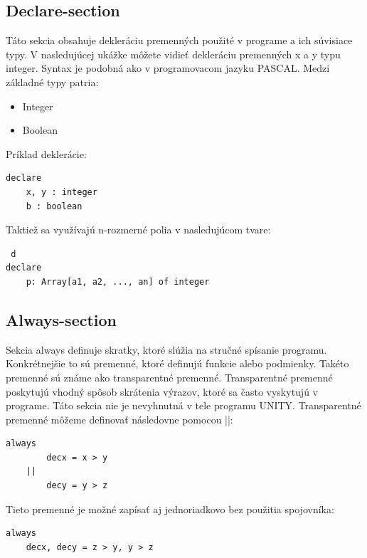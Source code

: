 \subsection{Declare-section}

Táto sekcia obsahuje dekleráciu premenných použité v programe a ich súvisiace typy. 
V nasledujúcej ukážke môžete vidieť dekleráciu premenných x a y typu integer. 
Syntax je podobná ako v programovacom jazyku PASCAL. Medzi základné typy patria:
\begin{itemize}
	\item Integer
	\item Boolean
\end{itemize}

\vspace{5mm}

Príklad deklerácie:
\begin{lstlisting}
declare 
	x, y : integer
	b : boolean
\end{lstlisting}

\vspace{5mm}

Taktiež sa využívajú n-rozmerné polia v nasledujúcom tvare:
\begin{lstlisting} d
declare 
	p: Array[a1, a2, ..., an] of integer
\end{lstlisting}

\subsection{Always-section}

Sekcia always definuje skratky, ktoré slúžia na stručné spísanie programu. 
Konkrétnejšie to sú premenné, ktoré definujú funkcie alebo podmienky. 
Takéto premenné sú známe ako transparentné premenné. 
Transparentné premenné poskytujú vhodný spôsob skrátenia výrazov, ktoré sa často vyskytujú v programe. 
Táto sekcia nie je nevyhnutná v tele programu UNITY. Transparentné premenné môžeme definovať následovne pomocou ||:

\begin{lstlisting}
always
		decx = x > y
	||
		decy = y > z
\end{lstlisting}

Tieto premenné je možné zapísať aj jednoriadkovo bez použitia spojovníka:

\begin{lstlisting}
always
	decx, decy = z > y, y > z
\end{lstlisting}

